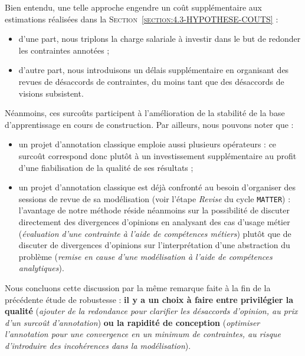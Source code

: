 			Bien entendu, une telle approche engendre un coût supplémentaire aux estimations réalisées dans la \textsc{Section~\ref{section:4.3-HYPOTHESE-COUTS}} :
			\begin{itemize}
				\item d'une part, nous triplons la charge salariale à investir dans le but de redonder les contraintes annotées ;
				\item d'autre part, nous introduisons un délais supplémentaire en organisant des revues de désaccords de contraintes, du moins tant que des désaccords de visions subsistent.
			\end{itemize}
			Néanmoins, ces surcoûts participent à l'amélioration de la stabilité de la base d'apprentissage en cours de construction.
			Par ailleurs, nous pouvons noter que :
			\begin{itemize}
				\item un projet d'annotation classique emploie aussi plusieurs opérateurs : ce surcoût correspond donc plutôt à un investissement supplémentaire au profit d'une fiabilisation de la qualité de ses résultats ;
				\item un projet d'annotation classique est déjà confronté au besoin d'organiser des sessions de revue de sa modélisation (voir l'étape \textit{Revise} du cycle \texttt{MATTER}) : l'avantage de notre méthode réside néanmoins sur la possibilité de discuter directement des divergences d'opinions en analysant des cas d'usage métier (\textit{évaluation d'une contrainte à l'aide de compétences métiers}) plutôt que de discuter de divergences d'opinions sur l'interprétation d'une abstraction du problème (\textit{remise en cause d'une modélisation à l'aide de compétences analytiques}).
			\end{itemize}
			
			\begin{leftBarAuthorOpinion}
				Nous concluons cette discussion par la même remarque faite à la fin de la précédente étude de robustesse : \textbf{il y a un choix à faire entre privilégier la qualité} (\textit{ajouter de la redondance pour clarifier les désaccords d'opinion, au prix d'un surcoût d'annotation}) \textbf{ou la rapidité de conception} (\textit{optimiser l'annotation pour une convergence en un minimum de contraintes, au risque d'introduire des incohérences dans la modélisation}).
			\end{leftBarAuthorOpinion}
	

